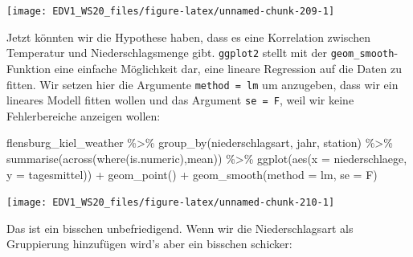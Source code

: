 \documentclass[
]{book}
\newenvironment{Shaded}{\begin{snugshade}}{\end{snugshade}}
\newcommand{\AttributeTok}[1]{\textcolor[rgb]{0.77,0.63,0.00}{#1}}
\newcommand{\FunctionTok}[1]{\textcolor[rgb]{0.00,0.00,0.00}{#1}}
\newcommand{\NormalTok}[1]{#1}
\newcommand{\SpecialCharTok}[1]{\textcolor[rgb]{0.00,0.00,0.00}{#1}}
\newcommand{\StringTok}[1]{\textcolor[rgb]{0.31,0.60,0.02}{#1}}
\begin{document}
\begin{center}\texttt{[image: EDV1\_WS20\_files/figure-latex/unnamed-chunk-209-1]} \end{center}

Jetzt könnten wir die Hypothese haben, dass es eine Korrelation zwischen Temperatur und Niederschlagsmenge gibt. \texttt{ggplot2} stellt mit der \texttt{geom\_smooth}-Funktion eine einfache Möglichkeit dar, eine lineare Regression auf die Daten zu fitten. Wir setzen hier die Argumente \texttt{method\ =\ \textquotesingle{}lm\textquotesingle{}} um anzugeben, dass wir ein lineares Modell fitten wollen und das Argument \texttt{se\ =\ F}, weil wir keine Fehlerbereiche anzeigen wollen:

\begin{Shaded}
\begin{Highlighting}[]
\NormalTok{flensburg\_kiel\_weather }\SpecialCharTok{\%\textgreater{}\%} 
  \FunctionTok{group\_by}\NormalTok{(niederschlagsart, jahr, station) }\SpecialCharTok{\%\textgreater{}\%} 
  \FunctionTok{summarise}\NormalTok{(}\FunctionTok{across}\NormalTok{(}\FunctionTok{where}\NormalTok{(is.numeric),mean)) }\SpecialCharTok{\%\textgreater{}\%} 
  \FunctionTok{ggplot}\NormalTok{(}\FunctionTok{aes}\NormalTok{(}\AttributeTok{x =}\NormalTok{ niederschlaege, }
             \AttributeTok{y =}\NormalTok{ tagesmittel)) }\SpecialCharTok{+}
  \FunctionTok{geom\_point}\NormalTok{() }\SpecialCharTok{+}
  \FunctionTok{geom\_smooth}\NormalTok{(}\AttributeTok{method =} \StringTok{\textquotesingle{}lm\textquotesingle{}}\NormalTok{,}
              \AttributeTok{se =}\NormalTok{ F)}
\end{Highlighting}
\end{Shaded}

\begin{center}\texttt{[image: EDV1\_WS20\_files/figure-latex/unnamed-chunk-210-1]} \end{center}

Das ist ein bisschen unbefriedigend. Wenn wir die Niederschlagsart als Gruppierung hinzufügen wird's aber ein bisschen schicker:
\end{document}
